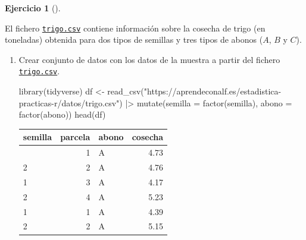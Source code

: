 \documentclass[
  a4paper,
]{scrreport}
\newenvironment{Shaded}{\begin{snugshade}}{\end{snugshade}}
\newcommand{\AttributeTok}[1]{\textcolor[rgb]{0.40,0.45,0.13}{#1}}
\newcommand{\FunctionTok}[1]{\textcolor[rgb]{0.28,0.35,0.67}{#1}}
\newcommand{\NormalTok}[1]{\textcolor[rgb]{0.00,0.23,0.31}{#1}}
\newcommand{\OtherTok}[1]{\textcolor[rgb]{0.00,0.23,0.31}{#1}}
\newcommand{\SpecialCharTok}[1]{\textcolor[rgb]{0.37,0.37,0.37}{#1}}
\newcommand{\StringTok}[1]{\textcolor[rgb]{0.13,0.47,0.30}{#1}}
\theoremstyle{definition}
\newtheorem{exercise}{Ejercicio}[chapter]
\theoremstyle{remark}
\begin{document}
\begin{exercise}[]\protect\hypertarget{exr-anova-dos-factores-trigo}{}\label{exr-anova-dos-factores-trigo}

El fichero
\href{https://aprendeconalf.es/estadistica-practicas-r/datos/trigo.csv}{\texttt{trigo.csv}}
contiene información sobre la cosecha de trigo (en toneladas) obtenida
para dos tipos de semillas y tres tipos de abonos (\(A\), \(B\) y
\(C\)).

\begin{enumerate}
\def\labelenumi{\alph{enumi}.}
\item
  Crear conjunto de datos con los datos de la muestra a partir del
  fichero
  \href{https://aprendeconalf.es/estadistica-practicas-r/datos/trigo.csv}{\texttt{trigo.csv}}.

  \begin{tcolorbox}[enhanced jigsaw, colframe=quarto-callout-tip-color-frame, toprule=.15mm, bottomtitle=1mm, breakable, opacitybacktitle=0.6, toptitle=1mm, colback=white, bottomrule=.15mm, title=\textcolor{quarto-callout-tip-color}{\faLightbulb}\hspace{0.5em}{Solución}, arc=.35mm, left=2mm, titlerule=0mm, rightrule=.15mm, coltitle=black, leftrule=.75mm, opacityback=0, colbacktitle=quarto-callout-tip-color!10!white]

\begin{Shaded}
\begin{Highlighting}[]
\FunctionTok{library}\NormalTok{(tidyverse)}
\NormalTok{df }\OtherTok{\textless{}{-}} \FunctionTok{read\_csv}\NormalTok{(}\StringTok{"https://aprendeconalf.es/estadistica{-}practicas{-}r/datos/trigo.csv"}\NormalTok{) }\SpecialCharTok{|\textgreater{}} 
    \FunctionTok{mutate}\NormalTok{(}\AttributeTok{semilla =} \FunctionTok{factor}\NormalTok{(semilla), }\AttributeTok{abono =} \FunctionTok{factor}\NormalTok{(abono))}
\FunctionTok{head}\NormalTok{(df)}
\end{Highlighting}
\end{Shaded}

  \begin{longtable}[]{@{}lrlr@{}}
  \toprule\noalign{}
  semilla & parcela & abono & cosecha \\
  \midrule\noalign{}
  \endhead
  \bottomrule\noalign{}
  \endlastfoot
  1 & 1 & A & 4.73 \\
  2 & 2 & A & 4.76 \\
  1 & 3 & A & 4.17 \\
  2 & 4 & A & 5.23 \\
  1 & 1 & A & 4.39 \\
  2 & 2 & A & 5.15 \\
  \end{longtable}


\end{tcolorbox}
\end{enumerate}
\end{exercise}
\end{document}
